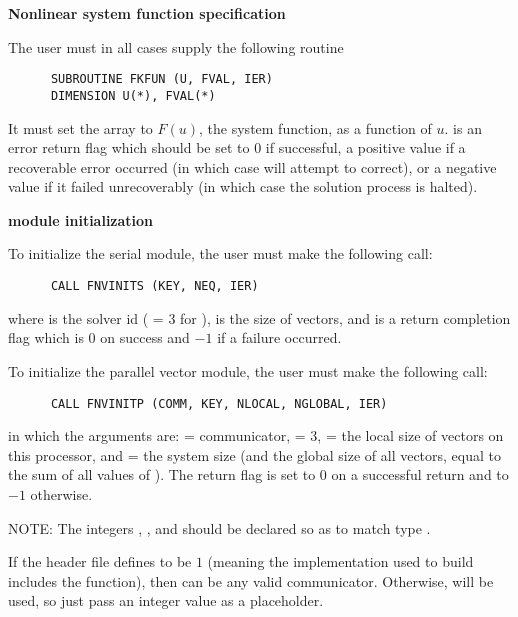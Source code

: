 \begin{Steps}
 
\item {\bf Nonlinear system function specification}
  
  The user must in all cases supply the following {\F} routine
\begin{verbatim}
      SUBROUTINE FKFUN (U, FVAL, IER)
      DIMENSION U(*), FVAL(*)
\end{verbatim}
  It must set the  array to $F(u)$, the system function,
  as a function of  $u$.  
   is an error return flag which should be set to $0$ if successful,
  a positive value if a recoverable error occurred (in which case {\kinsol}
  will attempt to correct), or a negative value if it failed unrecoverably
  (in which case the solution process is halted).

\item  {\bf {\nvector} module initialization}

  {\s} To initialize the serial {\nvector} module, the user must make the
  following call:
\begin{verbatim}
      CALL FNVINITS (KEY, NEQ, IER)
\end{verbatim}
  where 
   is the solver id ( = 3 for {\kinsol}),
   is the size of vectors, and
   is a  return completion flag which is $0$ on success and $-1$ 
  if a failure occurred.
  
  {\p} To initialize the parallel vector module, the user must make the
  following call:
\begin{verbatim}
      CALL FNVINITP (COMM, KEY, NLOCAL, NGLOBAL, IER)
\end{verbatim}
  in which the arguments are:  = {\mpi} communicator,  = 3,
   = the local size of
  vectors on this processor, and  = the system size (and the global
  size of all vectors, equal to the sum of all values of ).
  The return flag  is set to $0$ on a successful return and to $-1$
  otherwise.

  NOTE: The integers , , and  should be
  declared so as to match {\C} type .

  {\warn}If the header file  defines
   to be $1$ (meaning the {\mpi}
  implementation used to build {\sundials} includes the
   function), then  can be any valid
  {\mpi} communicator. Otherwise,  will be used, so
  just pass an integer value as a placeholder.


\end{Steps}
